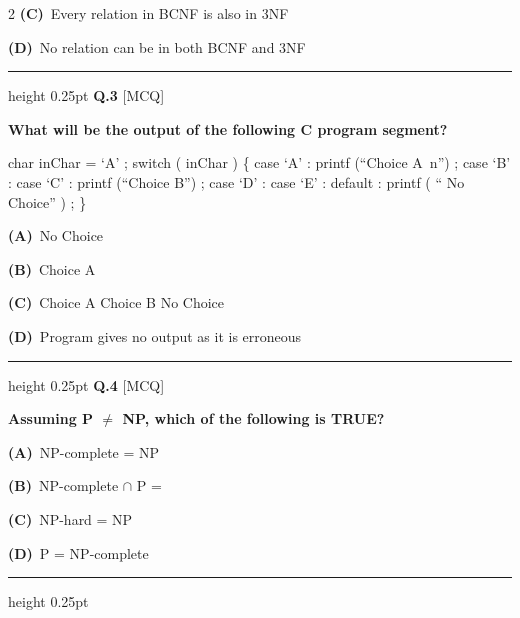 \documentclass[a4paper,10pt,twoside]{article}
\begin{document}
\begin{multicols}{2}
\textbf{(C)}~Every relation in BCNF is also in 3NF\par\vspace{2pt}\noindent
\textbf{(D)}~No relation can be in both BCNF and 3NF
\par\vspace{6pt}\hrule height 0.25pt\vspace{6pt}
\noindent\textbf{Q.3} \hfill {\footnotesize\textsf{[MCQ]}}
\par\vspace{2pt}
{\bfseries What will be the output of the following C program segment?
\par\smallskip
char inChar = `A' ;
switch ( inChar ) \{
case `A' : printf (``Choice A\ n'') ;
case `B' :
case `C' : printf (``Choice B'') ;
case `D' :
case `E' :
default : printf ( `` No Choice'' ) ; \} \par}
\par\vspace{2pt}\noindent
\textbf{(A)}~No Choice\par\vspace{2pt}\noindent
\textbf{(B)}~Choice A\par\vspace{2pt}\noindent
\textbf{(C)}~Choice A \newline Choice B No Choice\par\vspace{2pt}\noindent
\textbf{(D)}~Program gives no output as it is erroneous
\par\vspace{6pt}\hrule height 0.25pt\vspace{6pt}
\noindent\textbf{Q.4} \hfill {\footnotesize\textsf{[MCQ]}}
\par\vspace{2pt}
{\bfseries Assuming P $\ne$ NP, which of the following is TRUE? \par}
\par\vspace{2pt}\noindent
\textbf{(A)}~NP-complete = NP\par\vspace{2pt}\noindent
\textbf{(B)}~NP-complete $\cap$ P = \par\vspace{2pt}\noindent
\textbf{(C)}~NP-hard = NP\par\vspace{2pt}\noindent
\textbf{(D)}~P = NP-complete
\par\vspace{6pt}\hrule height 0.25pt\vspace{6pt}

\end{multicols}
\end{document}
